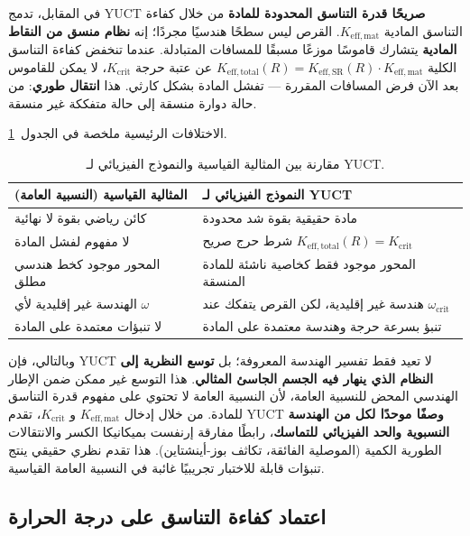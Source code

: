 \documentclass[12pt,a4paper]{article}
\newcommand{\Keffmat}{K_{\mathrm{eff,mat}}}
\newcommand{\Kefftot}{K_{\mathrm{eff,total}}}
\newcommand{\KeffSR}{K_{\mathrm{eff,SR}}}
\newcommand{\Kcrit}{K_{\mathrm{crit}}}
\begin{document}
	في المقابل، تدمج YUCT \textbf{صريحًا قدرة التناسق المحدودة للمادة} من خلال كفاءة التناسق المادية \(K_{\mathrm{eff,mat}}\). القرص ليس سطحًا هندسيًا مجردًا؛ إنه \textbf{نظام منسق من النقاط المادية} يتشارك قاموسًا موزعًا مسبقًا للمسافات المتبادلة. عندما تنخفض كفاءة التناسق الكلية \(\Kefftot(R) = \KeffSR(R) \cdot \Keffmat\) عن عتبة حرجة \(\Kcrit\)، لا يمكن للقاموس بعد الآن فرض المسافات المقررة — تفشل المادة بشكل كارثي. هذا \textbf{انتقال طوري}: من حالة دوارة منسقة إلى حالة متفككة غير منسقة.
	
	الاختلافات الرئيسية ملخصة في الجدول~\ref{tab:idealization}.
	
	\begin{table}[h]
		\centering
		\caption{مقارنة بين المثالية القياسية والنموذج الفيزيائي لـ YUCT.}
		\label{tab:idealization}
		\begin{tabular}{p{5cm}p{5cm}}
			\toprule
			\textbf{المثالية القياسية (النسبية العامة)} & \textbf{النموذج الفيزيائي لـ YUCT} \\
			\midrule
			كائن رياضي بقوة لا نهائية & مادة حقيقية بقوة شد محدودة \\
			لا مفهوم لفشل المادة & شرط حرج صريح \(\Kefftot(R) = \Kcrit\) \\
			المحور موجود كخط هندسي مطلق & المحور موجود فقط كخاصية ناشئة للمادة المنسقة \\
			الهندسة غير إقليدية لأي \(\omega\) & هندسة غير إقليدية، لكن القرص يتفكك عند \(\omega_{\text{crit}}\) \\
			لا تنبؤات معتمدة على المادة & تنبؤ بسرعة حرجة وهندسة معتمدة على المادة \\
			\bottomrule
		\end{tabular}
	\end{table}
	
	وبالتالي، فإن YUCT لا تعيد فقط تفسير الهندسة المعروفة؛ بل \textbf{توسع النظرية إلى النظام الذي ينهار فيه الجسم الجاسئ المثالي}. هذا التوسع غير ممكن ضمن الإطار الهندسي المحض للنسبية العامة، لأن النسبية العامة لا تحتوي على مفهوم قدرة التناسق للمادة. من خلال إدخال \(\Keffmat\) و \(\Kcrit\)، تقدم YUCT \textbf{وصفًا موحدًا لكل من الهندسة النسبوية والحد الفيزيائي للتماسك}، رابطًا مفارقة إرنفست بميكانيكا الكسر والانتقالات الطورية الكمية (الموصلية الفائقة، تكاثف بوز-أينشتاين). هذا تقدم نظري حقيقي ينتج تنبؤات قابلة للاختبار تجريبيًا غائبة في النسبية العامة القياسية.
	
	\subsection{اعتماد كفاءة التناسق على درجة الحرارة}
	
\end{document}
